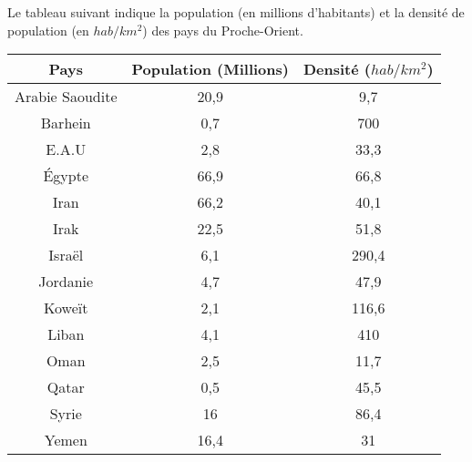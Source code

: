
Le tableau suivant indique la population (en millions d’habitants) et la densité de population (en $hab/km^2$) des pays du Proche-Orient.

\begin{tabular}{|c|c|c|}
\hline 
Pays & Population (Millions) & Densité ($hab/km^2$) \\ 
\hline 
Arabie Saoudite & 20,9 & 9,7 \\ 
\hline 
Barhein & 0,7 & 700 \\ 
\hline 
E.A.U & 2,8 & 33,3 \\ 
\hline 
Égypte & 66,9 & 66,8 \\ 
\hline 
Iran & 66,2 & 40,1 \\ 
\hline 
Irak & 22,5 & 51,8 \\ 
\hline 
Israël & 6,1 & 290,4 \\ 
\hline 
Jordanie & 4,7 & 47,9 \\ 
\hline 
Koweït & 2,1 & 116,6 \\ 
\hline 
Liban & 4,1 & 410 \\ 
\hline 
Oman & 2,5 & 11,7 \\ 
\hline 
Qatar & 0,5 & 45,5 \\ 
\hline 
Syrie & 16 & 86,4 \\ 
\hline 
Yemen & 16,4 & 31 \\ 
\hline 
\end{tabular} 

